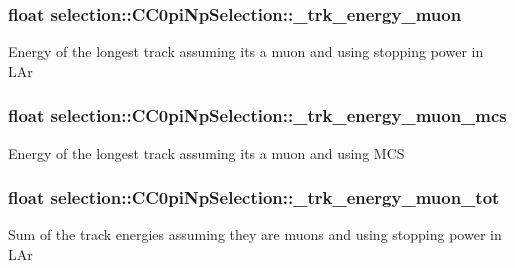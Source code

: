 \subsubsection[{\texorpdfstring{\+\_\+trk\+\_\+energy\+\_\+muon}{_trk_energy_muon}}]{\setlength{\rightskip}{0pt plus 5cm}float selection\+::\+C\+C0pi\+Np\+Selection\+::\+\_\+trk\+\_\+energy\+\_\+muon\hspace{0.3cm}{\ttfamily [private]}}\hypertarget{classselection_1_1CC0piNpSelection_aabcb2e3b6df63f077fc37d881c1794a3}{}\label{classselection_1_1CC0piNpSelection_aabcb2e3b6df63f077fc37d881c1794a3}
Energy of the longest track assuming it\textquotesingle{}s a muon and using stopping power in L\+Ar 
\subsubsection[{\texorpdfstring{\+\_\+trk\+\_\+energy\+\_\+muon\+\_\+mcs}{_trk_energy_muon_mcs}}]{\setlength{\rightskip}{0pt plus 5cm}float selection\+::\+C\+C0pi\+Np\+Selection\+::\+\_\+trk\+\_\+energy\+\_\+muon\+\_\+mcs\hspace{0.3cm}{\ttfamily [private]}}\hypertarget{classselection_1_1CC0piNpSelection_a4ae8946bcc37ce152c81ba3c28d60fbb}{}\label{classselection_1_1CC0piNpSelection_a4ae8946bcc37ce152c81ba3c28d60fbb}
Energy of the longest track assuming it\textquotesingle{}s a muon and using M\+CS 
\subsubsection[{\texorpdfstring{\+\_\+trk\+\_\+energy\+\_\+muon\+\_\+tot}{_trk_energy_muon_tot}}]{\setlength{\rightskip}{0pt plus 5cm}float selection\+::\+C\+C0pi\+Np\+Selection\+::\+\_\+trk\+\_\+energy\+\_\+muon\+\_\+tot\hspace{0.3cm}{\ttfamily [private]}}\hypertarget{classselection_1_1CC0piNpSelection_aebac9c09110d469f5d7ed3817c33e437}{}\label{classselection_1_1CC0piNpSelection_aebac9c09110d469f5d7ed3817c33e437}
Sum of the track energies assuming they are muons and using stopping power in L\+Ar 
